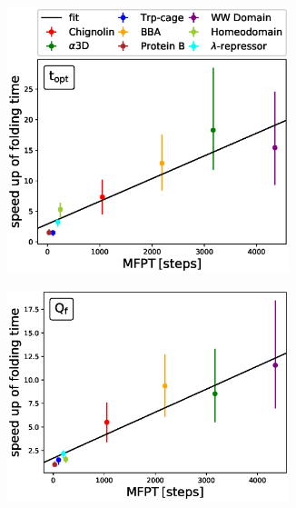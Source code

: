 \begin{figure}[H]
  \begin{subfigure}[t]{0.5\textwidth}
    \includegraphics[width=0.9\textwidth]{figures/compare_MD_speed_up_t_opt_6_steps10000_52_0.eps}
  \end{subfigure}
  \begin{subfigure}[t]{0.5\textwidth}
    \includegraphics[width=0.9\textwidth]{figures/compare_MD_speed_up_qcore_only_6_steps10000_52.eps}
  \end{subfigure}
  \begin{subfigure}[t]{0.5\textwidth}

\end{subfigure}
\end{figure}
